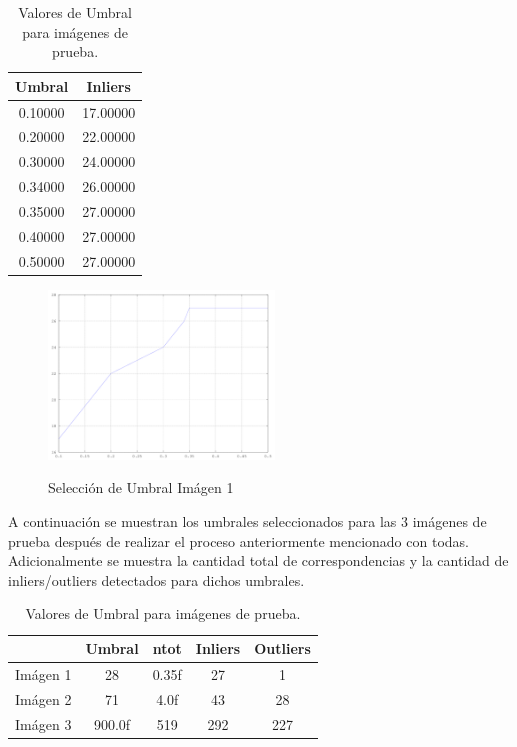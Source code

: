 \documentclass{IEEEtran}
\begin{document}
\begin{table}[H]
\centering
\begin{tabular}{*2c}
\toprule
 Umbral & Inliers \\
 \midrule
0.10000&   17.00000\\
0.20000&   22.00000\\
0.30000&   24.00000\\
0.34000&   26.00000\\
{\color{red}0.35000}&   {\color{red}27.00000}\\
0.40000&   27.00000\\
0.50000&   27.00000\\
\bottomrule
 \end{tabular}
 \caption{Valores de Umbral para imágenes de prueba.}
 \label{tb:thrs1}
 \end{table} 

\begin{figure}[H]
\caption{Selección de Umbral Imágen 1}
\centering
\includegraphics[width=6cm,natwidth=1200,natheight=900]{figs/thrs1.png}
\label{fig:thrs1}
\end{figure} 

A continuación se muestran los umbrales seleccionados para
las 3 imágenes de prueba después de realizar el proceso anteriormente
mencionado con todas. Adicionalmente se muestra la cantidad total de correspondencias
y la cantidad de inliers/outliers detectados para dichos umbrales.

\begin{table}[H]
\centering
\begin{tabular}{*5c}
\toprule
 & Umbral & ntot & Inliers &Outliers \\
\midrule
Imágen 1 & 28 &  0.35f & 27 & 1\\
Imágen 2 & 71 & 4.0f & 43 & 28\\
Imágen 3 & 900.0f & 519 & 292 & 227\\
\bottomrule
\end{tabular}
\caption{Valores de Umbral para imágenes de prueba.}
\label{tb:umbral}
\end{table} 
\end{document}
